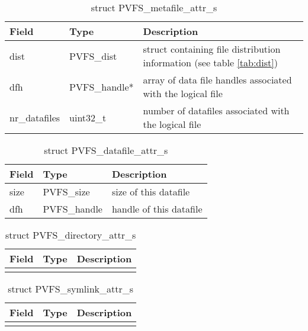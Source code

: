 \documentclass[11pt, letterpaper]{article} %
\begin{document}
\begin{table}[H]
\begin{tabular}{|l|l|l|}
\hline
Field & Type & Description \\
\hline
\hline
dist & PVFS\_dist & struct containing file distribution information (see
table \ref{tab:dist})\\
\hline
dfh & PVFS\_handle* & array of data file handles associated with
the logical file\\
\hline
nr\_datafiles & uint32\_t & number of datafiles associated
with the logical file\\
\hline
\end{tabular}
\caption{struct PVFS\_metafile\_attr\_s \label{tab:meta}}
\end{table}

\begin{table}[H]
\begin{tabular}{|l|l|l|}
\hline
Field & Type & Description \\
\hline
\hline
size & PVFS\_size & size of this datafile\\
\hline
dfh & PVFS\_handle & handle of this datafile\\
\hline
\end{tabular}
\caption{struct PVFS\_datafile\_attr\_s \label{tab:data}}
\end{table}

\begin{table}[H]
\begin{tabular}{|l|l|l|}
\hline
Field & Type & Description \\
\hline
\hline
[ EMPTY ] & & \\
\hline
\end{tabular}
\caption{struct PVFS\_directory\_attr\_s \label{tab:dir}}
\end{table}

\begin{table}[H]
\begin{tabular}{|l|l|l|}
\hline
Field & Type & Description \\
\hline
\hline
[ EMPTY ] & & \\
\hline
\end{tabular}
\caption{struct PVFS\_symlink\_attr\_s \label{tab:sym}}
\end{table}
\end{document}

